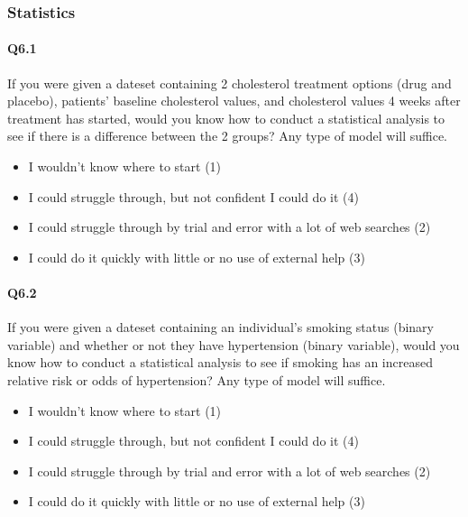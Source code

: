 \documentclass[020-persona\_validation.tex]{subfiles}
\begin{document}
    \subsubsection{Statistics}

        \paragraph{Q6.1}

            If you were given a dateset containing 2 cholesterol treatment options (drug and placebo),
            patients' baseline cholesterol values, and
            cholesterol values 4 weeks after treatment has started,
            would you know how to conduct a statistical analysis to see if there is a difference between the 2 groups?
            Any type of model will suffice.

            \begin{itemize}
                \item I wouldn't know where to start  (1)
                \item I could struggle through, but not confident I could do it  (4)
                \item I could struggle through by trial and error with a lot of web searches  (2)
                \item I could do it quickly with little or no use of external help  (3)
            \end{itemize}

        \paragraph{Q6.2}

            If you were given a dateset containing an individual's smoking status
            (binary variable) and whether or not they have hypertension (binary variable),
            would you know how to conduct a statistical analysis to see
            if smoking has an increased relative risk or odds of hypertension? Any
            type of model will suffice.

            \begin{itemize}
                \item I wouldn't know where to start  (1)
                \item I could struggle through, but not confident I could do it  (4)
                \item I could struggle through by trial and error with a lot of web searches  (2)
                \item I could do it quickly with little or no use of external help  (3)
            \end{itemize}
\end{document}
